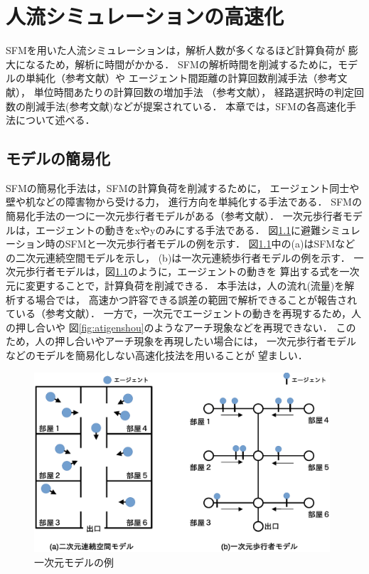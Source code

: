 \chapter{人流シミュレーションの高速化}
\label{sec:survey}
SFMを用いた人流シミュレーションは，解析人数が多くなるほど計算負荷が
膨大になるため，解析に時間がかかる．
SFMの解析時間を削減するために，モデルの単純化（参考文献）や
エージェント間距離の計算回数削減手法（参考文献），
単位時間あたりの計算回数の増加手法 （参考文献），
経路選択時の判定回数の削減手法(参考文献)などが提案されている．
本章では，SFMの各高速化手法について述べる．

\section{モデルの簡易化}
SFMの簡易化手法は，SFMの計算負荷を削減するために，
エージェント同士や壁や机などの障害物から受ける力，
進行方向を単純化する手法である．
SFMの簡易化手法の一つに一次元歩行者モデルがある（参考文献）．
一次元歩行者モデルは，エージェントの動きをxやyのみにする手法である．
図\ref{fig:ichijigen_ex}に避難シミュレーション時のSFMと一次元歩行者モデルの例を示す．
図\ref{fig:ichijigen_ex}中の(a)はSFMなどの二次元連続空間モデルを示し，
(b)は一次元連続歩行者モデルの例を示す．
一次元歩行者モデルは，図\ref{fig:ichijigen_ex}のように，エージェントの動きを
算出する式を一次元に変更することで，計算負荷を削減できる．
本手法は，人の流れ(流量)を解析する場合では，
高速かつ許容できる誤差の範囲で解析できることが報告されている（参考文献）．
一方で，一次元でエージェントの動きを再現するため，人の押し合いや
図\ref{fig:atigenshou}のようなアーチ現象などを再現できない．
このため，人の押し合いやアーチ現象を再現したい場合には，
一次元歩行者モデルなどのモデルを簡易化しない高速化技法を用いることが
望ましい．

\begin{figure}[hbtp]
 \begin{center}
  \includegraphics[width=11cm,clip]{figure/ichijigen_ex.eps}
  \caption{一次元モデルの例}
  \label{fig:ichijigen_ex}
 \end{center}
\end{figure}

